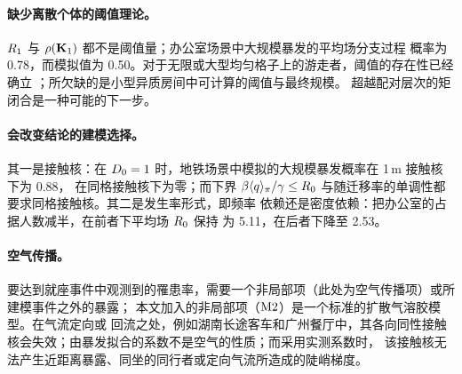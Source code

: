 \paragraph{缺少离散个体的阈值理论。}$R_1$ 与 $\rho(\mathbf{K}_1)$ 都不是阈值量；办公室场景中大规模暴发的平均场分支过程
概率为 0.78，而模拟值为 0.50。对于无限或大型均匀格子上的游走者，阈值的存在性已经确立
\citep{kesten2006phase,maia2007diffusive,carvalho2025generalized}；所欠缺的是小型异质房间中可计算的阈值与最终规模。
超越配对层次的矩闭合\citep{keeling1999effects,kiss2017mathematics}是一种可能的下一步。

\paragraph{会改变结论的建模选择。}其一是接触核：在 $D_0=1$ 时，地铁场景中模拟的大规模暴发概率在 1\,m 接触核下为 0.88，
在同格接触核下为零；而下界 $\beta\langle q\rangle_{\pi}/\gamma\le R_0$ 与随迁移率的单调性都要求同格接触核。其二是发生率形式，即频率
依赖还是密度依赖\citep{anderson1991infectious,keeling2008modeling}：把办公室的占据人数减半，在前者下平均场 $R_0$ 保持
为 5.11，在后者下降至 2.53。

\paragraph{空气传播。}要达到就座事件中观测到的罹患率，需要一个非局部项（此处为空气传播项）或所建模事件之外的暴露；
本文加入的非局部项（$\mathrm{M2}$）是一个标准的扩散气溶胶模型\citep{venkatram2021modeling,lau2022predicting}。在气流定向或
回流之处，例如湖南长途客车和广州餐厅中，其各向同性接触核会失效；由暴发拟合的系数不是空气的性质；而采用实测系数时，
该接触核无法产生近距离暴露、同坐的同行者或定向气流所造成的陡峭梯度。

